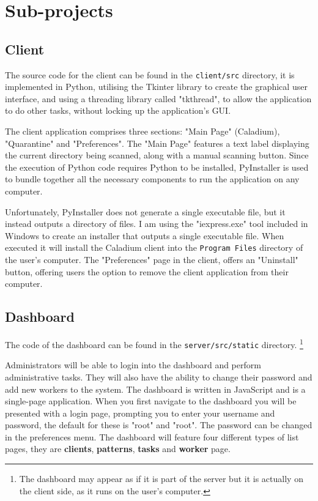 \section{Sub-projects}
\subsection{Client}
The source code for the client can be found in
the \texttt{client/src} directory, it is implemented in Python,
utilising the Tkinter library to create the graphical user interface,
and using a threading library called "tkthread",
to allow the application to do other tasks,
without locking up the application's GUI.

The client application comprises three sections:
"Main Page" (Caladium), "Quarantine" and "Preferences".
The "Main Page" features a text label displaying
the current directory being scanned,
along with a manual scanning button.
Since the execution of Python code requires Python to be installed,
PyInstaller is used to bundle together all the
necessary components to run the application on any computer.

Unfortunately, PyInstaller does not generate a single executable file,
but it instead outputs a directory of files.
I am using the "iexpress.exe" tool included in Windows to
create an installer that outputs a single executable file.
When executed it will install the Caladium client
into the \texttt{Program Files} directory of the user's computer.
The "Preferences" page in the client, offers an "Uninstall" button,
offering users the option to remove the client application from their computer.

\subsection{Dashboard}
The code of the dashboard can be found in the \texttt{server/src/static} directory.
\footnote{The dashboard may appear as if it is part of the server
but it is actually on the client side, as it runs on the user's computer.}

Administrators will be able to login into the dashboard
and perform administrative tasks.
They will also have the ability to change their
password and add new workers to the system.
The dashboard is written in JavaScript and is a single-page application.
When you first navigate to the dashboard you will be presented with a login page,
prompting you to enter your username and password,
the default for these is "root" and "root".
The password can be changed in the preferences menu.
The dashboard will feature four different types of list pages,
they are \textbf{clients}, \textbf{patterns},
\textbf{tasks} and \textbf{worker} page.

